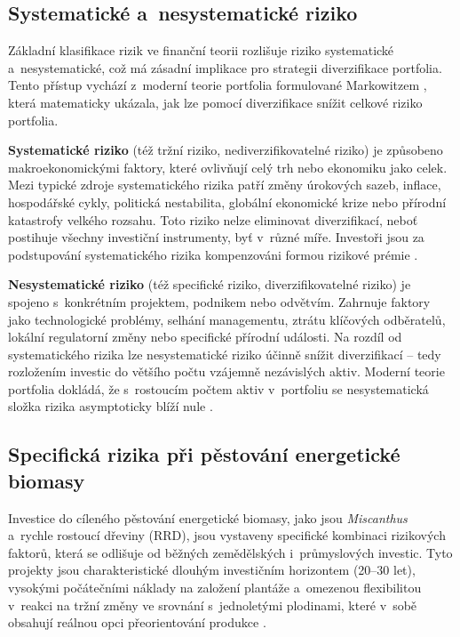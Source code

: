 \subsection{Systematické a~nesystematické riziko}
\label{subsec:system-nesystem-new}

Základní klasifikace rizik ve finanční teorii rozlišuje riziko 
systematické a~nesystematické, což má zásadní implikace pro 
strategii diverzifikace portfolia. Tento přístup vychází 
z~moderní teorie portfolia formulované Markowitzem 
\citep{Markowitz1952}, která matematicky ukázala, jak lze 
pomocí diverzifikace snížit celkové riziko portfolia.

\textbf{Systematické riziko} (též tržní riziko, nediverzifikovatelné riziko) je způsobeno makroekonomickými faktory, které ovlivňují celý trh nebo ekonomiku jako celek. Mezi typické zdroje systematického rizika patří změny úrokových sazeb, inflace, hospodářské cykly, politická nestabilita, globální ekonomické krize nebo přírodní katastrofy velkého rozsahu. Toto riziko nelze eliminovat diverzifikací, neboť postihuje všechny investiční instrumenty, byť v~různé míře. Investoři jsou za podstupování systematického rizika kompenzováni formou rizikové prémie \cite{fotr_soucek_2011}.

\textbf{Nesystematické riziko} (též specifické riziko, diverzifikovatelné riziko) je spojeno s~konkrétním projektem, podnikem nebo odvětvím. Zahrnuje faktory jako technologické problémy, selhání managementu, ztrátu klíčových odběratelů, lokální regulatorní změny nebo specifické přírodní události. Na rozdíl od systematického rizika lze nesystematické riziko účinně snížit diverzifikací -- tedy rozložením investic do většího počtu vzájemně nezávislých aktiv. Moderní teorie portfolia dokládá, že s~rostoucím počtem aktiv v~portfoliu se nesystematická složka rizika asymptoticky blíží nule \cite{Markowitz1959}.

\subsection{Specifická rizika při pěstování energetické biomasy}
\label{subsec:specificka-rizika}

Investice do cíleného pěstování energetické biomasy, jako jsou
\textit{Miscanthus} a~rychle rostoucí dřeviny (RRD), jsou vystaveny
specifické kombinaci rizikových faktorů, která se odlišuje od běžných
zemědělských i~průmyslových investic. Tyto projekty jsou charakteristické
dlouhým investičním horizontem (20--30 let), vysokými počátečními náklady
na založení plantáže a~omezenou flexibilitou v~reakci na tržní změny ve srovnání
s~jednoletými plodinami, které v~sobě obsahují reálnou opci přeorientování
produkce \citep{knapek_2024}.

